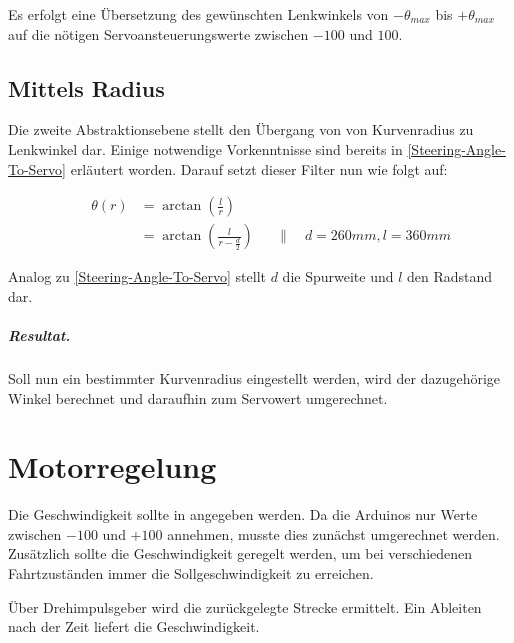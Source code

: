\documentclass[a4paper,12pt]{report}
\begin{document}
	Es erfolgt eine Übersetzung des gewünschten Lenkwinkels von $-\theta_{max}$ bis $+\theta_{max}$ auf die nötigen Servoansteuerungswerte zwischen $-100$ und $100$.

\section{Mittels Radius}

	Die zweite Abstraktionsebene stellt den Übergang von von Kurvenradius zu Lenkwinkel dar.
	Einige notwendige Vorkenntnisse sind bereits in \autoref{Steering-Angle-To-Servo} erläutert worden.
	Darauf setzt dieser Filter nun wie folgt auf:

		\begin{align*}
		&&\theta\left(r\right) &= \arctan\left( \frac{l}{r} \right)\\
		&&&= \arctan\left( \frac{l}{r - \frac{d}{2}} \right) &&\|\quad d = 260mm, l = 360mm
		\end{align*}

	Analog zu \autoref{Steering-Angle-To-Servo} stellt $d$ die Spurweite und $l$ den Radstand dar.

	\paragraph{Resultat.}
	Soll nun ein bestimmter Kurvenradius eingestellt werden, wird der dazugehörige Winkel berechnet und daraufhin zum Servowert umgerechnet.


\chapter{Motorregelung}

	Die Geschwindigkeit sollte in \meter\per\second\usk angegeben werden.
	Da die Arduinos nur Werte zwischen $-100$ und $+100$ annehmen, musste dies zunächst umgerechnet werden.
	Zusätzlich sollte die Geschwindigkeit geregelt werden, um bei verschiedenen Fahrtzuständen immer die Sollgeschwindigkeit zu erreichen.

	Über Drehimpulsgeber wird die zurückgelegte Strecke ermittelt.
	Ein Ableiten nach der Zeit liefert die Geschwindigkeit.
\end{document}
